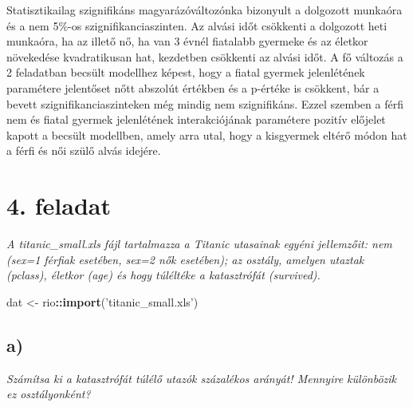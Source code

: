 \documentclass[
]{article}
\newenvironment{Shaded}{\begin{snugshade}}{\end{snugshade}}
\newcommand{\DataTypeTok}[1]{\textcolor[rgb]{0.13,0.29,0.53}{#1}}
\newcommand{\FloatTok}[1]{\textcolor[rgb]{0.00,0.00,0.81}{#1}}
\newcommand{\KeywordTok}[1]{\textcolor[rgb]{0.13,0.29,0.53}{\textbf{#1}}}
\newcommand{\NormalTok}[1]{#1}
\newcommand{\OperatorTok}[1]{\textcolor[rgb]{0.81,0.36,0.00}{\textbf{#1}}}
\newcommand{\StringTok}[1]{\textcolor[rgb]{0.31,0.60,0.02}{#1}}
\begin{document}
Statisztikailag szignifikáns magyarázóváltozónka bizonyult a dolgozott
munkaóra és a nem 5\%-os szignifikanciaszinten. Az alvási időt csökkenti
a dolgozott heti munkaóra, ha az illető nő, ha van 3 évnél fiatalabb
gyermeke és az életkor növekedése kvadratikusan hat, kezdetben csökkenti
az alvási időt. A fő változás a 2 feladatban becsült modellhez képest,
hogy a fiatal gyermek jelenlétének paramétere jelentőset nőtt abszolút
értékben és a p-értéke is csökkent, bár a bevett szignifikanciaszinteken
még mindig nem szignifikáns. Ezzel szemben a férfi nem és fiatal gyermek
jelenlétének interakciójának paramétere pozitív előjelet kapott a
becsült modellben, amely arra utal, hogy a kisgyermek eltérő módon hat a
férfi és női szülő alvás idejére.

\hypertarget{feladat-3}{%
\section{4. feladat}\label{feladat-3}}

\emph{A titanic\_small.xls fájl tartalmazza a Titanic utasainak egyéni
jellemzőit: nem (sex=1 férfiak esetében, sex=2 nők esetében); az
osztály, amelyen utaztak (pclass), életkor (age) és hogy túléltéke a
katasztrófát (survived).}

\begin{Shaded}
\begin{Highlighting}[]
\NormalTok{dat <-}\StringTok{ }\NormalTok{rio}\OperatorTok{::}\KeywordTok{import}\NormalTok{(}\StringTok{'titanic_small.xls'}\NormalTok{)}
\end{Highlighting}
\end{Shaded}

\hypertarget{a-3}{%
\subsection{a)}\label{a-3}}

\emph{Számítsa ki a katasztrófát túlélő utazók százalékos arányát!
Mennyire különbözik ez osztályonként?}

\begin{Shaded}
\end{Shaded}
\end{document}
